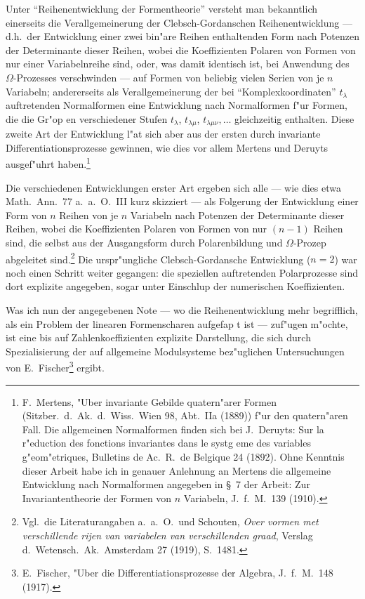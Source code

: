 \documentclass[12pt,a4paper]{article}
\begin{document}
Unter ``Reihenentwicklung der Formentheorie'' versteht man bekanntlich einerseits die Verallgemeinerung der Clebsch-Gordanschen Reihenentwicklung --- d.h.\ der Entwicklung einer zwei bin"are Reihen enthaltenden Form nach Potenzen der Determinante dieser Reihen, wobei die Koeffizienten Polaren von Formen von nur einer Variabelnreihe sind, oder, was damit identisch ist, bei Anwendung des $\Omega$-Prozesses verschwinden --- auf Formen von beliebig vielen Serien von je $n$ Variabeln; andererseits als Verallgemeinerung der bei ``Komplexkoordinaten'' $t_\lambda$ auftretenden Normalformen eine Entwicklung nach Normalformen f"ur Formen, die die Gr"op en verschiedener Stufen $t_\lambda$, $t_{\lambda\mu}$, $t_{\lambda\mu\nu},\ldots$ gleichzeitig enthalten. Diese zweite Art der Entwicklung l"at sich aber aus der ersten durch invariante Differentiationsprozesse gewinnen, wie dies vor allem Mertens und Deruyts ausgef"uhrt haben.\footnote{F.\ Mertens, "Uber invariante Gebilde quatern"arer Formen (Sitzber.\ d.\ Ak.\ d.\ Wiss.\ Wien 98, Abt.\ IIa (1889)) f"ur den quatern"aren Fall. Die allgemeinen Normalformen finden sich bei J.\ Deruyts: Sur la r"eduction des fonctions invariantes dans le systg eme des variables g"eom"etriques, Bulletins de Ac.\ R.\ de Belgique 24 (1892). Ohne Kenntnis dieser Arbeit habe ich in genauer Anlehnung an Mertens die allgemeine Entwicklung nach Normalformen angegeben in \S\ 7 der Arbeit: Zur Invariantentheorie der Formen von $n$ Variabeln, J.\ f.\ M.\ 139 (1910).}

Die verschiedenen Entwicklungen erster Art ergeben sich alle --- wie dies etwa Math.\ Ann.\ 77 a.\ a.\ O.\ III kurz skizziert --- als Folgerung der Entwicklung einer Form von $n$ Reihen von je $n$ Variabeln nach Potenzen der Determinante dieser Reihen, wobei die Koeffizienten Polaren von Formen von nur $(n-1)$ Reihen sind, die selbst aus der Ausgangsform durch Polarenbildung und $\Omega$-Prozep abgeleitet sind.\footnote{Vgl.\ die Literaturangaben a.\ a.\ O.\ und Schouten, \textit{Over vormen met verschillende rijen van variabelen van verschillenden graad}, Verslag d.\ Wetensch.\ Ak.\ Amsterdam 27 (1919), S.~1481.} Die urspr"ungliche Clebsch-Gordansche Entwicklung ($n=2$) war noch einen Schritt weiter gegangen: die speziellen auftretenden Polarprozesse sind dort explizite angegeben, sogar unter Einschlup der numerischen Koeffizienten.

Was ich nun der angegebenen Note --- wo die Reihenentwicklung mehr begrifflich, als ein Problem der linearen Formenscharen aufgefap t ist --- zuf"ugen m"ochte, ist eine bis auf Zahlenkoeffizienten explizite Darstellung, die sich durch Spezialisierung der auf allgemeine Modulsysteme bez"uglichen Untersuchungen von E.\ Fischer\footnote{E.\ Fischer, "Uber die Differentiationsprozesse der Algebra, J.\ f.\ M.\ 148 (1917).} ergibt.
\end{document}
